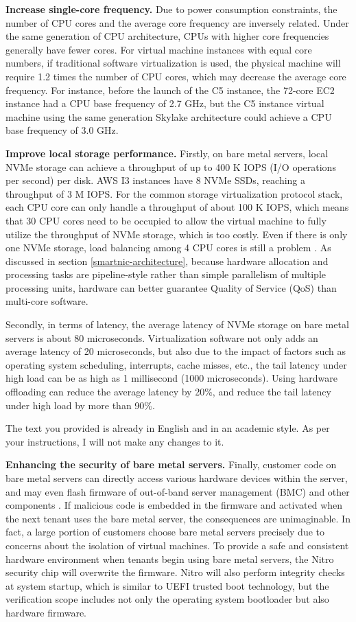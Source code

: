 \textbf{Increase single-core frequency.}
Due to power consumption constraints, the number of CPU cores and the average core frequency are inversely related. Under the same generation of CPU architecture, CPUs with higher core frequencies generally have fewer cores. For virtual machine instances with equal core numbers, if traditional software virtualization is used, the physical machine will require 1.2 times the number of CPU cores, which may decrease the average core frequency. For instance, before the launch of the C5 instance, the 72-core EC2 instance had a CPU base frequency of 2.7 GHz, but the C5 instance virtual machine using the same generation Skylake architecture could achieve a CPU base frequency of 3.0 GHz.

\textbf{Improve local storage performance.}
Firstly, on bare metal servers, local NVMe storage can achieve a throughput of up to 400 K IOPS (I/O operations per second) per disk. AWS I3 instances have 8 NVMe SSDs, reaching a throughput of 3 M IOPS. For the common storage virtualization protocol stack, each CPU core can only handle a throughput of about 100 K IOPS, which means that 30 CPU cores need to be occupied to allow the virtual machine to fully utilize the throughput of NVMe storage, which is too costly. Even if there is only one NVMe storage, load balancing among 4 CPU cores is still a problem \cite{li2017kv}. As discussed in section \ref{smartnic-architecture}, because hardware allocation and processing tasks are pipeline-style rather than simple parallelism of multiple processing units, hardware can better guarantee Quality of Service (QoS) than multi-core software.

Secondly, in terms of latency, the average latency of NVMe storage on bare metal servers is about 80 microseconds. Virtualization software not only adds an average latency of 20 microseconds, but also due to the impact of factors such as operating system scheduling, interrupts, cache misses, etc., the tail latency under high load can be as high as 1 millisecond (1000 microseconds). Using hardware offloading can reduce the average latency by 20\%, and reduce the tail latency under high load by more than 90\%.

The text you provided is already in English and in an academic style. As per your instructions, I will not make any changes to it.

\textbf{Enhancing the security of bare metal servers.}
Finally, customer code on bare metal servers can directly access various hardware devices within the server, and may even flash firmware of out-of-band server management (BMC) and other components \cite{bare-metal-security}. If malicious code is embedded in the firmware and activated when the next tenant uses the bare metal server, the consequences are unimaginable. In fact, a large portion of customers choose bare metal servers precisely due to concerns about the isolation of virtual machines. To provide a safe and consistent hardware environment when tenants begin using bare metal servers, the Nitro security chip will overwrite the firmware. Nitro will also perform integrity checks at system startup, which is similar to UEFI trusted boot technology, but the verification scope includes not only the operating system bootloader but also hardware firmware.

